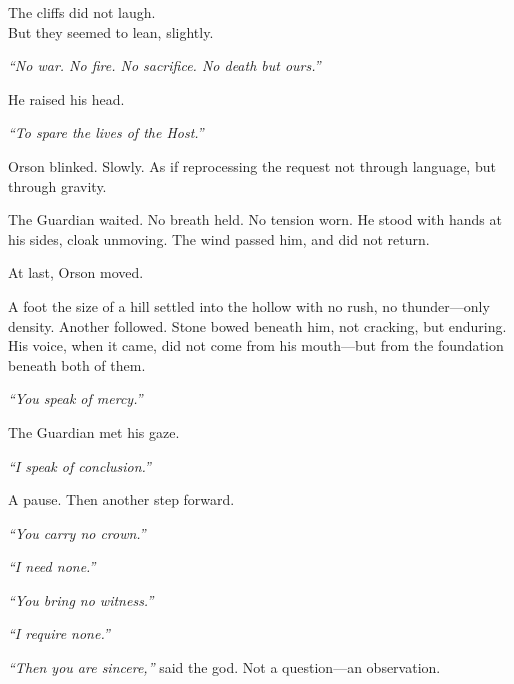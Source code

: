 \documentclass[12pt]{article}
\begin{document}
\vspace{0.5em}
The cliffs did not laugh.\\
But they seemed to lean, slightly.

\vspace{0.5em}
\textit{``No war. No fire. No sacrifice. No death but ours.''}

\vspace{0.5em}
He raised his head.

\vspace{0.5em}
\textit{``To spare the lives of the Host.''}

\vspace{0.5em}
Orson blinked. Slowly. As if reprocessing the request not through language, but through gravity.

\vspace{0.5em}
The Guardian waited. No breath held. No tension worn. He stood with hands at his sides, cloak unmoving. The wind passed him, and did not return.

\vspace{0.5em}
At last, Orson moved.

\vspace{0.5em}
A foot the size of a hill settled into the hollow with no rush, no thunder---only density. Another followed. Stone bowed beneath him, not cracking, but enduring. His voice, when it came, did not come from his mouth---but from the foundation beneath both of them.

\vspace{0.5em}
\textit{``You speak of mercy.''}

\vspace{0.5em}
The Guardian met his gaze.

\vspace{0.5em}
\textit{``I speak of conclusion.''}

\vspace{0.5em}
A pause. Then another step forward.

\vspace{0.5em}
\textit{``You carry no crown.''}

\vspace{0.5em}
\textit{``I need none.''}

\vspace{0.5em}
\textit{``You bring no witness.''}

\vspace{0.5em}
\textit{``I require none.''}

\vspace{0.5em}
\textit{``Then you are sincere,''} said the god. Not a question---an observation.
\end{document}
